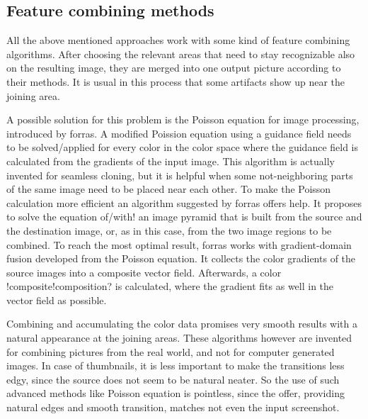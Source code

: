 \documentclass[draft,final]{vutinfth} %
\begin{document}
	\subsection{Feature combining methods}
All the above mentioned approaches work with some kind of feature combining algorithms.
After choosing the relevant areas that need to stay recognizable also on the resulting image, they are merged into one output picture according to their methods.
It is usual in this process  that some artifacts show up near the joining area.\par 
A possible solution for this problem is the Poisson equation for image processing, introduced by forras.
A modified Poission equation using a guidance field needs to be solved/applied for every color in the color space where the guidance field is calculated from the gradients of the input image.
This algorithm is actually invented for seamless cloning, but it is helpful when some not-neighboring parts of the same image need to be placed near each other.
To make the Poisson calculation more efficient an algorithm suggested by forras offers help.
It proposes to solve the equation of/with! an image pyramid that is built from the source and the destination image, or, as in this case, from the two image regions to be combined.
To reach the most optimal result, forras works with gradient-domain fusion developed from the Poisson equation.
It collects the color gradients of the source images into a composite vector field.
Afterwards,  a color !composite!composition? is calculated, where the gradient fits as well in the vector field as possible. \par 
Combining and accumulating the color data promises very smooth results with a natural appearance at the joining areas. 
These algorithms however are invented for combining pictures from the real world, and not for computer generated images.
In case of thumbnails, it is less important to make the transitions less edgy, since the source does not seem to be natural neater. 
So the use of such advanced methods like Poisson equation is pointless, since the offer, providing natural edges and smooth transition, matches not even the input screenshot. 
	
	
	
\end{document}
